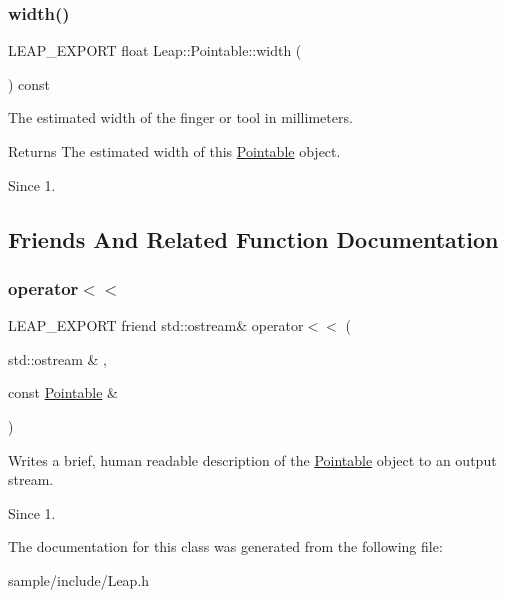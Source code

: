 \subsubsection{\texorpdfstring{width()}{width()}}
{\footnotesize\ttfamily L\+E\+A\+P\+\_\+\+E\+X\+P\+O\+RT float Leap\+::\+Pointable\+::width (\begin{DoxyParamCaption}{ }\end{DoxyParamCaption}) const}

The estimated width of the finger or tool in millimeters.


\begin{DoxyCodeInclude}
\end{DoxyCodeInclude}


\begin{DoxyReturn}{Returns}
The estimated width of this \hyperlink{class_leap_1_1_pointable}{Pointable} object. 
\end{DoxyReturn}
\begin{DoxySince}{Since}
1. 
\end{DoxySince}


\subsection{Friends And Related Function Documentation}
\mbox{\label{class_leap_1_1_pointable_a3e0fe2f963f09cfaf2d4dc9b93c85b4d}} 
\subsubsection{\texorpdfstring{operator$<$$<$}{operator<<}}
{\footnotesize\ttfamily L\+E\+A\+P\+\_\+\+E\+X\+P\+O\+RT friend std\+::ostream\& operator$<$$<$ (\begin{DoxyParamCaption}\item[{std\+::ostream \&}]{,  }\item[{const \hyperlink{class_leap_1_1_pointable}{Pointable} \&}]{ }\end{DoxyParamCaption})\hspace{0.3cm}{\ttfamily [friend]}}

Writes a brief, human readable description of the \hyperlink{class_leap_1_1_pointable}{Pointable} object to an output stream.


\begin{DoxyCodeInclude}
\end{DoxyCodeInclude}


\begin{DoxySince}{Since}
1. 
\end{DoxySince}


The documentation for this class was generated from the following file\+:\begin{DoxyCompactItemize}
\item 
sample/include/Leap.\+h\end{DoxyCompactItemize}

